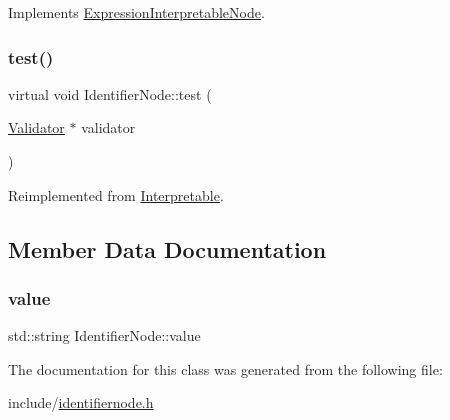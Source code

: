 Implements \hyperlink{classExpressionInterpretableNode_a43650f046c48fc539f77a207e3c9181e}{Expression\+Interpretable\+Node}.

\mbox{\label{classIdentifierNode_a1459965d8f22ade30cb78b2a1d60dd07}} 
\subsubsection{\texorpdfstring{test()}{test()}}
{\footnotesize\ttfamily virtual void Identifier\+Node\+::test (\begin{DoxyParamCaption}\item[{\hyperlink{classValidator}{Validator} $\ast$}]{validator }\end{DoxyParamCaption})\hspace{0.3cm}{\ttfamily [virtual]}}



Reimplemented from \hyperlink{classInterpretable_a32f547aaf68dcbab993284d3257ab010}{Interpretable}.



\subsection{Member Data Documentation}
\mbox{\label{classIdentifierNode_a7d92bad6e678bdff5f87f53bd55a53fb}} 
\subsubsection{\texorpdfstring{value}{value}}
{\footnotesize\ttfamily std\+::string Identifier\+Node\+::value}



The documentation for this class was generated from the following file\+:\begin{DoxyCompactItemize}
\item 
include/\hyperlink{identifiernode_8h}{identifiernode.\+h}\end{DoxyCompactItemize}
